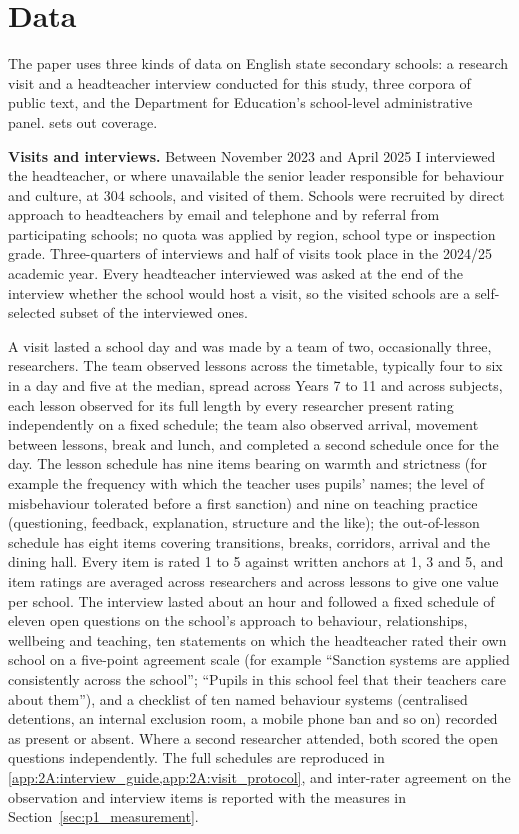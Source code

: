 \section{Data}
\label{sec:p1_data}

The paper uses three kinds of data on English state secondary schools: a
research visit and a headteacher interview conducted for this study, three
corpora of public text, and the Department for Education's school-level
administrative panel.  sets out coverage.

\textbf{Visits and interviews.} Between November 2023 and April 2025 I
interviewed the headteacher, or where unavailable the senior leader
responsible for behaviour and culture, at 304 schools, and visited
\NTierOne{} of them. Schools were recruited by direct approach to
headteachers by email and telephone and by referral from participating
schools; no quota was applied by region, school type or inspection grade.
Three-quarters of interviews and half of visits took place in the 2024/25
academic year. Every headteacher interviewed was asked at the end of the
interview whether the school would host a visit, so the visited schools are a
self-selected subset of the interviewed ones.

A visit lasted a school day and was made by a team of two, occasionally
three, researchers. The team observed lessons across the timetable, typically
four to six in a day and five at the median, spread across Years 7 to 11 and
across subjects, each lesson observed for its full length by every researcher
present rating independently on a fixed schedule; the team also observed
arrival, movement between lessons, break and lunch, and completed a second
schedule once for the day. The lesson schedule has nine items bearing on
warmth and strictness (for example the frequency with which the teacher uses
pupils' names; the level of misbehaviour tolerated before a first sanction)
and nine on teaching practice (questioning, feedback, explanation, structure
and the like); the out-of-lesson schedule has eight items covering
transitions, breaks, corridors, arrival and the dining hall. Every item is
rated 1 to 5 against written anchors at 1, 3 and 5, and item ratings are
averaged across researchers and across lessons to give one value per school.
The interview lasted about an hour and followed a fixed schedule of eleven
open questions on the school's approach to behaviour, relationships, wellbeing
and teaching, ten statements on which the headteacher rated their own school
on a five-point agreement scale (for example ``Sanction systems are applied
consistently across the school''; ``Pupils in this school feel that their
teachers care about them''), and a checklist of ten named behaviour systems
(centralised detentions, an internal exclusion room, a mobile phone ban and
so on) recorded as present or absent. Where a second researcher attended, both
scored the open questions independently. The full schedules are reproduced in
\cref{app:2A:interview_guide,app:2A:visit_protocol}, and inter-rater agreement
on the observation and interview items is reported with the measures in
Section~\ref{sec:p1_measurement}.

